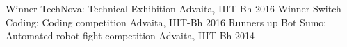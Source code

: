 \begin{cvhonors}
  \cvhonor
    {Winner}
    {TechNova: Technical Exhibition}
    {Advaita, IIIT-Bh}
    {2016}
  \cvhonor
    {Winner}
    {Switch Coding: Coding competition}
    {Advaita, IIIT-Bh}
    {2016}
  \cvhonor
    {Runners up}
    {Bot Sumo: Automated robot fight competition}
    {Advaita, IIIT-Bh}
    {2014}
\end{cvhonors}
